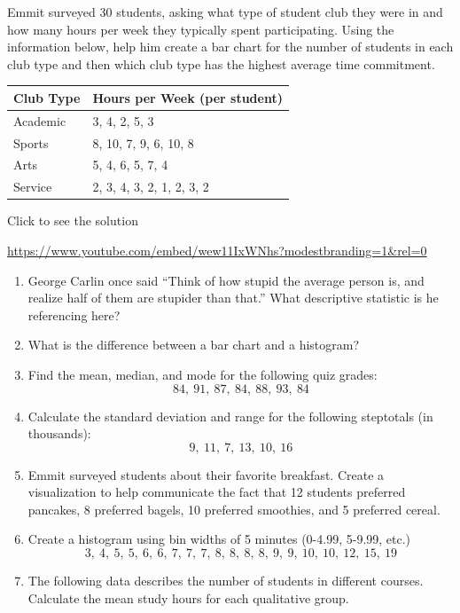 \documentclass[
  letterpaper,
  DIV=11,
  numbers=noendperiod]{scrreprt}
\begin{document}
\begin{tcolorbox}[enhanced jigsaw, colbacktitle=quarto-callout-tip-color!10!white, breakable, bottomrule=.15mm, colframe=quarto-callout-tip-color-frame, left=2mm, opacitybacktitle=0.6, title=\textcolor{quarto-callout-tip-color}{\faLightbulb}\hspace{0.5em}{Try it Out}, leftrule=.75mm, opacityback=0, rightrule=.15mm, titlerule=0mm, bottomtitle=1mm, colback=white, toprule=.15mm, arc=.35mm, toptitle=1mm, coltitle=black]

Emmit surveyed 30 students, asking what type of student club they were
in and how many hours per week they typically spent participating. Using
the information below, help him create a bar chart for the number of
students in each club type and then which club type has the highest
average time commitment.

\begin{longtable}[]{@{}ll@{}}
\toprule\noalign{}
Club Type & Hours per Week (per student) \\
\midrule\noalign{}
\endhead
\bottomrule\noalign{}
\endlastfoot
Academic & 3, 4, 2, 5, 3 \\
Sports & 8, 10, 7, 9, 6, 10, 8 \\
Arts & 5, 4, 6, 5, 7, 4 \\
Service & 2, 3, 4, 3, 2, 1, 2, 3, 2 \\
\end{longtable}

Click to see the solution

\url{https://www.youtube.com/embed/wew11IxWNhs?modestbranding=1&rel=0}

\end{tcolorbox}

\begin{enumerate}
\def\labelenumi{\arabic{enumi})}
\item
  George Carlin once said ``Think of how stupid the average person is,
  and realize half of them are stupider than that.'' What descriptive
  statistic is he referencing here?
\item
  What is the difference between a bar chart and a histogram?
\item
  Find the mean, median, and mode for the following quiz grades:
  \[ 84,\ 91,\ 87,\ 84,\ 88,\ 93,\ 84\]
\item
  Calculate the standard deviation and range for the following
  steptotals (in thousands): \[9,\ 11,\ 7,\ 13,\ 10,\ 16\]
\item
  Emmit surveyed students about their favorite breakfast. Create a
  visualization to help communicate the fact that 12 students preferred
  pancakes, 8 preferred bagels, 10 preferred smoothies, and 5 preferred
  cereal.
\item
  Create a histogram using bin widths of 5 minutes (0-4.99, 5-9.99,
  etc.)
  \[3,\ 4,\ 5,\ 5,\ 6,\ 6,\ 7,\ 7,\ 7,\ 8,\ 8,\ 8,\ 8,\ 9,\ 9,\ 10,\ 10,\ 12,\ 15,\ 19\]
\item
  The following data describes the number of students in different
  courses. Calculate the mean study hours for each qualitative group.
\end{enumerate}
\end{document}
